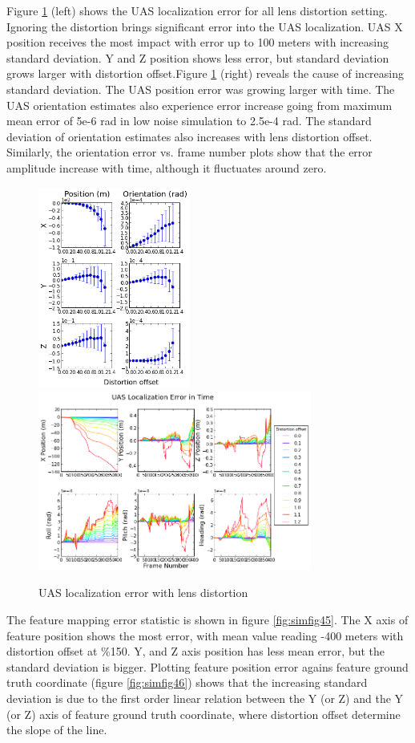Figure \ref{fig:simfig48} (left) shows the UAS localization error for all
lens distortion setting. Ignoring the distortion brings significant
error into the UAS localization. UAS X position receives the most
impact with error up to 100 meters with increasing standard deviation.
Y and Z position shows less error, but standard deviation grows larger
with distortion offset.Figure \ref{fig:simfig48} (right) reveals the cause of
increasing standard deviation. The UAS position error was growing
larger with time. The UAS orientation estimates also experience error
increase going from maximum mean error of 5e-6 rad in low noise
simulation to 2.5e-4 rad. The standard deviation of orientation
estimates also increases with lens distortion offset. Similarly, the
orientation error vs. frame number plots show that the error amplitude
increase with time, although it fluctuates around zero. 

\begin{figure}[h]
  \centering
  \includegraphics[width=5cm,keepaspectratio=true]{./Figures/SimulationFigures/Figure47.png}
  \includegraphics[width=9cm,keepaspectratio=true]{./Figures/SimulationFigures/Figure48.png}
  \caption{UAS localization error with lens distortion}
  \label{fig:simfig48}
\end{figure}

The feature mapping error statistic is shown in figure
\ref{fig:simfig45}. The X axis of feature position shows the most
error, with mean value reading -400 meters with distortion offset at
\%150. Y, and Z axis position has less mean error, but the standard
deviation is bigger. Plotting feature position error agains feature
ground truth coordinate (figure \ref{fig:simfig46}) shows that the
increasing standard deviation is due to the first order linear
relation between the Y (or Z) and the Y (or Z) axis of feature ground
truth coordinate, where distortion offset determine the slope of the
line. 

